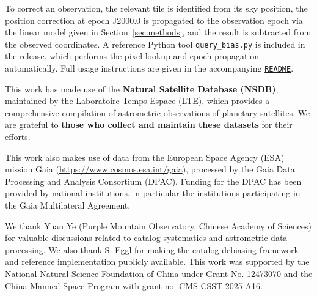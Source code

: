 \documentclass[linenumbers,amsmath,manuscript]{aastex702}
\begin{document}
To correct an observation, the relevant tile is identified from its sky position, the position correction at epoch J2000.0 is propagated to the observation epoch via the linear model given in Section~\ref{sec:methods}, and the result is subtracted from the observed coordinates. A reference Python tool \texttt{query\_bias.py} is included in the release, which performs the pixel lookup and epoch propagation automatically. Full usage instructions are given in the accompanying \href{https://nadc.china-vo.org/res/file_upload/download?id=1109148}{\texttt{README}}.

\clearpage

\onecolumngrid

\begin{acknowledgments}

This work has made use of the \textbf{Natural Satellite Database (NSDB)}, maintained by the Laboratoire Temps Espace (LTE), which provides a comprehensive compilation of astrometric observations of planetary satellites. We are grateful to \textbf{those who collect and maintain these datasets} for their efforts.

This work also makes use of data from the European Space Agency (ESA) mission Gaia (\url{https://www.cosmos.esa.int/gaia}), processed by the Gaia Data Processing and Analysis Consortium (DPAC). Funding for the DPAC has been provided by national institutions, in particular the institutions participating in the Gaia Multilateral Agreement.

We thank Yuan Ye (Purple Mountain Observatory, Chinese Academy of Sciences) for valuable discussions related to catalog systematics and astrometric data processing. We also thank S. Eggl for making the catalog debiasing framework and reference implementation publicly available. This work was supported by the National Natural Science Foundation of China under Grant No. 12473070 and the China Manned Space Program with grant no. CMS-CSST-2025-A16.
\end{acknowledgments}




\end{document}
